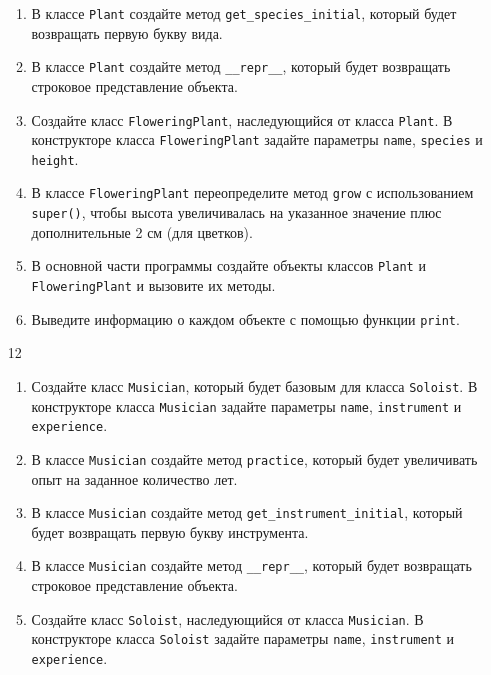 \begin{enumerate}
\begin{enumerate}[leftmargin=*]
    \item В классе \texttt{Plant} создайте метод \texttt{get\_species\_initial}, который будет возвращать первую букву вида.
    
    \item В классе \texttt{Plant} создайте метод \texttt{\_\_repr\_\_}, который будет возвращать строковое представление объекта.
    
    \item Создайте класс \texttt{FloweringPlant}, наследующийся от класса \texttt{Plant}. В конструкторе класса \texttt{FloweringPlant} задайте параметры \texttt{name}, \texttt{species} и \texttt{height}.
    
    \item В классе \texttt{FloweringPlant} переопределите метод \texttt{grow} с использованием \texttt{super()}, чтобы высота увеличивалась на указанное значение плюс дополнительные 2 см (для цветков).
    
    \item В основной части программы создайте объекты классов \texttt{Plant} и \texttt{FloweringPlant} и вызовите их методы.
    
    \item Выведите информацию о каждом объекте с помощью функции \texttt{print}.
\end{enumerate}

\item[12] 
\begin{enumerate}[leftmargin=*]
    \item Создайте класс \texttt{Musician}, который будет базовым для класса \texttt{Soloist}. В конструкторе класса \texttt{Musician} задайте параметры \texttt{name}, \texttt{instrument} и \texttt{experience}.
    
    \item В классе \texttt{Musician} создайте метод \texttt{practice}, который будет увеличивать опыт на заданное количество лет.
    
    \item В классе \texttt{Musician} создайте метод \texttt{get\_instrument\_initial}, который будет возвращать первую букву инструмента.
    
    \item В классе \texttt{Musician} создайте метод \texttt{\_\_repr\_\_}, который будет возвращать строковое представление объекта.
    
    \item Создайте класс \texttt{Soloist}, наследующийся от класса \texttt{Musician}. В конструкторе класса \texttt{Soloist} задайте параметры \texttt{name}, \texttt{instrument} и \texttt{experience}.
    

\end{enumerate}
\end{enumerate}
